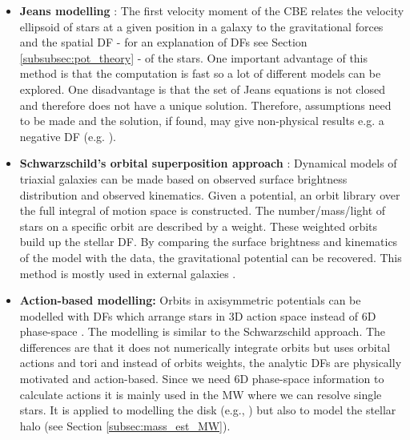 \begin{itemize}
    \item \textbf{Jeans modelling} \citep{Jeans.....1915}: The first velocity moment of the \ac{CBE} relates the velocity ellipsoid of stars at a given position in a galaxy to the gravitational forces and the spatial \ac{DF} - for an explanation of \acp{DF} see Section \ref{subsubsec:pot_theory} - of the stars. One important advantage of this method is that the computation is fast so a lot of different models can be explored. One disadvantage is that the set of Jeans equations is not closed and therefore does not have a unique solution. Therefore, assumptions need to be made and the solution, if found, may give non-physical results e.g. a negative \ac{DF} (e.g. \citealp{Eilers...Jeans...2018}). 
    \item \textbf{Schwarzschild's orbital superposition approach} \citep{Schwarzschild...1979}: Dynamical models of triaxial galaxies can be made based on observed surface brightness distribution and observed kinematics. Given a potential, an orbit library over the full integral of motion space is constructed. The number/mass/light of stars on a specific orbit are described by a weight. These weighted orbits build up the stellar \ac{DF}. By comparing the surface brightness and kinematics of the model with the data, the gravitational potential can be recovered. This method is mostly used in external galaxies \citep{Rix...Schwarzschild...1997, vdBosch...Schwarzschild...2008, Vasiliev...Schwarzschild...2013, Ling...Schwarzschild...2018}.
    \item \textbf{Action-based modelling:} Orbits in axisymmetric potentials can be modelled with \acp{DF} which arrange stars in 3D action space instead of 6D phase-space \citep{Binney...actionbasedmodelling...2012, Bovy...actionbasedmodelling...2013}. The modelling is similar to the Schwarzschild approach. The differences are that it does not numerically integrate orbits but uses orbital actions and tori and instead of orbits weights, the analytic \acp{DF} are physically motivated and action-based. Since we need 6D phase-space information to calculate actions it is mainly used in the \ac{MW} where we can resolve single stars. It is applied to modelling the disk (e.g., \citealp{trick...ROADMAPPING...2016, Wilmathesis}) but also to model the stellar halo (see Section \ref{subsec:mass_est_MW}). 
\end{itemize}
